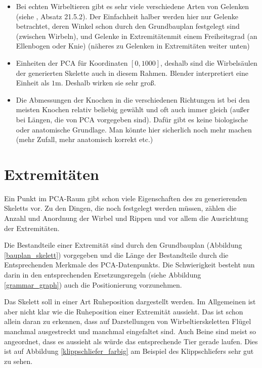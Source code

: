 \begin{itemize}
 \item Bei echten Wirbeltieren gibt es sehr viele verschiedene Arten von Gelenken (siehe \cite{Vergleichende_Anatomie}, Absatz 21.5.2). Der Einfachheit halber werden hier nur Gelenke betrachtet, deren Winkel schon durch den Grundbauplan festgelegt sind (\zb zwischen Wirbeln), und Gelenke in Extremitätenmit einem Freiheitsgrad (\zb an Ellenbogen oder Knie) (näheres zu Gelenken in Extremitäten weiter unten)

 \item Einheiten der PCA für Koordinaten $[0, 1000]$, deshalb sind die Wirbelsäulen der generierten Skelette auch in diesem Rahmen. Blender interpretiert eine Einheit als $1$m. Deshalb wirken sie sehr groß.
 
 \item Die Abmessungen der Knochen in die verschiedenen Richtungen ist bei den meisten Knochen relativ beliebig gewählt und oft auch immer gleich (außer bei Längen, die von PCA vorgegeben sind). Dafür gibt es keine biologische oder anatomische Grundlage. Man könnte hier sicherlich noch mehr machen (mehr Zufall, mehr anatomisch korrekt etc.)
\end{itemize}

\section{Extremitäten}
\label{section:extremity_generation}

Ein Punkt im PCA-Raum gibt schon viele Eigenschaften des zu generierenden Skeletts vor. Zu den Dingen, die noch festgelegt werden müssen, zählen \zb die Anzahl und Anordnung der Wirbel und Rippen und vor allem die Ausrichtung der Extremitäten. 

Die Bestandteile einer Extremität sind durch den Grundbauplan (Abbildung \ref{bauplan_skelett}) vorgegeben und die Länge der Bestandteile durch die Entsprechenden Merkmale des PCA-Datenpunkts. Die Schwierigkeit besteht nun darin in den entsprechenden Ersetzungsregeln (siehe Abbildung \ref{grammar_graph}) auch die Positionierung vorzunehmen.

Das Skelett soll in einer Art Ruheposition dargestellt werden. Im Allgemeinen ist aber nicht klar wie die Ruheposition einer Extremität aussieht. Das ist schon allein daran zu erkennen, dass auf Darstellungen von Wirbeltierskeletten Flügel manchmal ausgestreckt und manchmal eingefaltet sind. Auch Beine sind meist so angeordnet, dass es aussieht als würde das entsprechende Tier gerade laufen. Dies ist auf Abbildung \ref{klippschliefer_farbig} am Beispiel des Klippschliefers sehr gut zu sehen.

